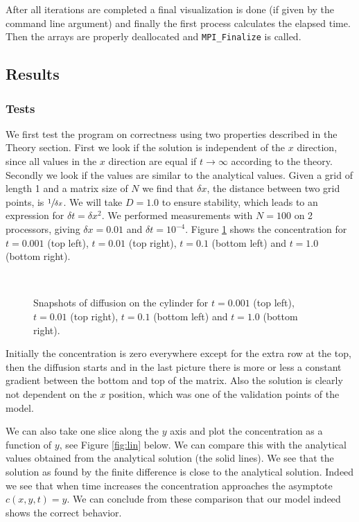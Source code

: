 \documentclass[11pt,a4paper,onecolumn]{article}
\begin{document}
After all iterations are completed a final visualization is done (if given by the command line argument) and finally the first process calculates the elapsed time. Then the arrays are properly deallocated and \texttt{MPI\_Finalize} is called.

\subsection{Results}
\subsubsection{Tests}
We first test the program on correctness using two properties described in the Theory section. First we look if the solution is independent of the $x$ direction, since all values in the $x$ direction are equal if $t \rightarrow \infty$ according to the theory. Secondly we look if the values are similar to the analytical values. Given a grid of length 1 and a matrix size of $N$ we find that $\delta x$, the distance between two grid points, is $\sfrac{1}{\delta x}$. We will take $D = 1.0$ to ensure stability, which leads to an expression for $\delta t = \delta x^2$. We performed measurements with $N = 100$ on 2 processors, giving $\delta x = 0.01$ and $\delta t = 10^{-4}$. Figure \ref{fig:diff} shows the concentration for $t = 0.001$ (top left), $t = 0.01$ (top right), $t = 0.1$ (bottom left) and $t = 1.0$ (bottom right).

\begin{figure}[H]
  \centering
  \\
  \caption{Snapshots of diffusion on the cylinder for $t = 0.001$ (top left), $t = 0.01$ (top right), $t = 0.1$ (bottom left) and $t = 1.0$ (bottom right).}
  \label{fig:diff}
\end{figure}

Initially the concentration is zero everywhere except for the extra row at the top, then the diffusion starts and in the last picture there is more or less a constant gradient between the bottom and top of the matrix. Also the solution is clearly not dependent on the $x$ position, which was one of the validation points of the model.

We can also take one slice along the $y$ axis and plot the concentration as a function of $y$, see Figure \ref{fig:lin} below. We can compare this with the analytical values obtained from the analytical solution (the solid lines). We see that the solution as found by the finite difference is close to the analytical solution. Indeed we see that when time increases the concentration approaches the asymptote $c(x,y,t) = y$. We can conclude from these comparison that our model indeed shows the correct behavior.
\end{document}
